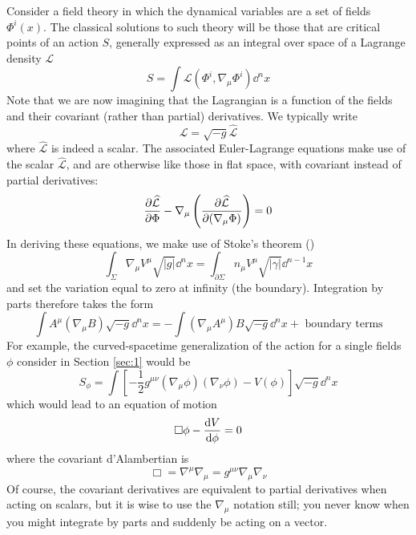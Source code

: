 Consider a field theory in which the dynamical variables are a set of fields $\Phi^{i}(x)$. The classical solutions to such theory will be those that are critical points of an action $S$, generally expressed as an integral over space of a Lagrange density $\mathcal{L}$
\begin{equation*}
    S=\int\mathcal{L}(\Phi^{i}, \nabla_\mu \Phi^{i})\dd^n x
\end{equation*}
Note that we are now imagining that the Lagrangian is a function of the fields and their covariant (rather than partial) derivatives. We typically write
\begin{equation*}
    \mathcal{L}=\sqrt{-g}\widehat{\mathcal{L}}
\end{equation*}
where $\widehat{\mathcal{L}}$ is indeed a scalar. The associated Euler-Lagrange equations make use of the scalar $\widehat{\mathcal{L}}$, and are otherwise like those in flat space, with covariant instead of partial derivatives:
\begin{equation*}
    \pdv{\widehat{\mathcal{L}}}{\Phi}-\nabla_\mu\left(\pdv{\widehat{\mathcal{L}}}{(\nabla_\mu \Phi)}\right)=0
\end{equation*}
In deriving these equations, we make use of Stoke's theorem ()
\begin{equation*}
    \int_\Sigma \nabla_\mu V^\mu \sqrt{|g|}\dd^nx=\int_{\partial\Sigma}n_\mu V^\mu\sqrt{|\gamma|}\dd^{n-1}x
\end{equation*}
and set the variation equal to zero at infinity (the boundary). Integration by parts therefore takes the form
\begin{equation*}
    \int A^\mu (\nabla_\mu B)\sqrt{-g}\dd^nx=-\int (\nabla_\mu A^\mu)B\sqrt{-g}\dd^nx+\text{ boundary terms}
\end{equation*}
For example, the curved-spacetime generalization of the action for a single fields $\phi$ consider in Section \ref{sec:1} would be
\begin{equation*}
    S_\phi=\int\left[-\frac{1}{2}g^{\mu\nu}(\nabla_\mu\phi)(\nabla_\nu\phi)-V(\phi)\right]\sqrt{-g}\dd^nx
\end{equation*}
which would lead to an equation of motion
\begin{equation*}
    \Box\phi-\dv{V}{\phi}=0
\end{equation*}
where the covariant d'Alambertian is
\begin{equation*}
    \Box=\nabla^\mu \nabla_\mu=g^{\mu\nu}\nabla_\mu \nabla_\nu
\end{equation*}
Of course, the covariant derivatives are equivalent to partial derivatives when acting on scalars, but it is wise to use the $\nabla_\mu$ notation still; you never know when you might integrate by parts and suddenly be acting on a vector.


